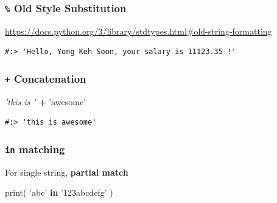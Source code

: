 \documentclass[
]{book}
\newenvironment{Shaded}{\begin{snugshade}}{\end{snugshade}}
\newcommand{\BuiltInTok}[1]{#1}
\newcommand{\CommentTok}[1]{\textcolor[rgb]{0.37,0.37,0.37}{\textit{#1}}}
\newcommand{\FloatTok}[1]{\textcolor[rgb]{0.06,0.06,0.06}{#1}}
\newcommand{\KeywordTok}[1]{\textcolor[rgb]{0.27,0.27,0.27}{\textbf{#1}}}
\newcommand{\NormalTok}[1]{#1}
\newcommand{\OperatorTok}[1]{\textcolor[rgb]{0.43,0.43,0.43}{\textbf{#1}}}
\newcommand{\StringTok}[1]{\textcolor[rgb]{0.5,0.5,0.5}{#1}}
\begin{document}
\hypertarget{old-style-substitution}{%
\subsubsection{\texorpdfstring{\texttt{\%} Old Style Substitution}{\% Old Style Substitution}}\label{old-style-substitution}}

\url{https://docs.python.org/3/library/stdtypes.html\#old-string-formatting}

\begin{Shaded}
\end{Shaded}

\begin{verbatim}
#:> 'Hello, Yong Keh Soon, your salary is 11123.35 !'
\end{verbatim}

\hypertarget{concatenation}{%
\subsubsection{\texorpdfstring{\texttt{+} Concatenation}{+ Concatenation}}\label{concatenation}}

\begin{Shaded}
\begin{Highlighting}[]
\CommentTok{'this is '} \OperatorTok{+} \StringTok{'awesome'}
\end{Highlighting}
\end{Shaded}

\begin{verbatim}
#:> 'this is awesome'
\end{verbatim}

\hypertarget{in-matching}{%
\subsubsection{\texorpdfstring{\texttt{in} matching}{in matching}}\label{in-matching}}

For single string, \textbf{partial match}

\begin{Shaded}
\begin{Highlighting}[]
\BuiltInTok{print}\NormalTok{( }\StringTok{'abc'} \KeywordTok{in} \StringTok{'123abcdefg'}\NormalTok{ )}
\end{Highlighting}
\end{Shaded}
\end{document}
